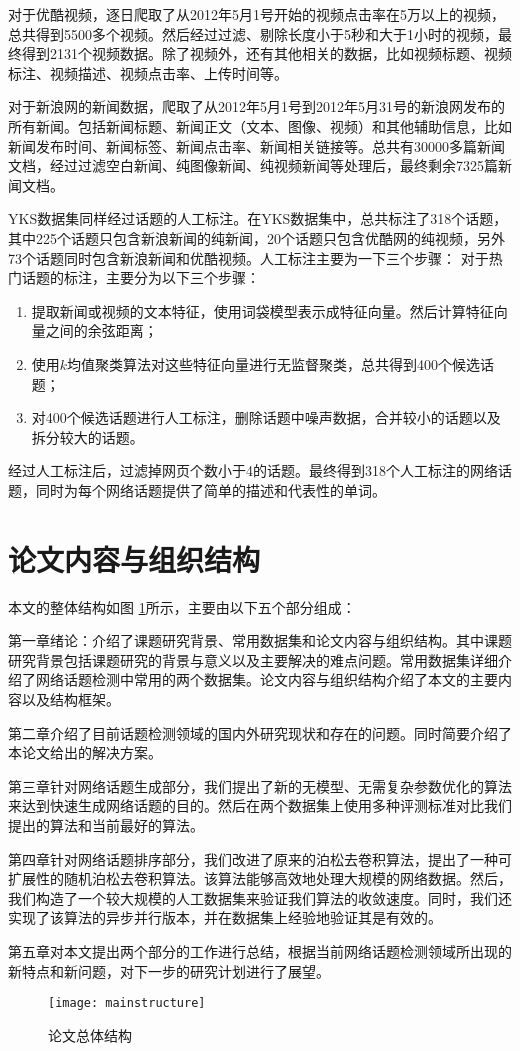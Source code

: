 对于优酷视频，逐日爬取了从2012年5月1号开始的视频点击率在5万以上的视频，总共得到5500多个视频。然后经过过滤、剔除长度小于5秒和大于1小时的视频，最终得到2131个视频数据。除了视频外，还有其他相关的数据，比如视频标题、视频标注、视频描述、视频点击率、上传时间等。

对于新浪网的新闻数据，爬取了从2012年5月1号到2012年5月31号的新浪网发布的所有新闻。包括新闻标题、新闻正文（文本、图像、视频）和其他辅助信息，比如新闻发布时间、新闻标签、新闻点击率、新闻相关链接等。总共有30000多篇新闻文档，经过过滤空白新闻、纯图像新闻、纯视频新闻等处理后，最终剩余7325篇新闻文档。

YKS数据集同样经过话题的人工标注。在YKS数据集中，总共标注了318个话题，其中225个话题只包含新浪新闻的纯新闻，20个话题只包含优酷网的纯视频，另外73个话题同时包含新浪新闻和优酷视频。人工标注主要为一下三个步骤：
对于热门话题的标注，主要分为以下三个步骤：
\begin{enumerate}
    \item[(1)] 提取新闻或视频的文本特征，使用词袋模型表示成特征向量。然后计算特征向量之间的余弦距离；
    \item[(2)] 使用$k$均值聚类算法对这些特征向量进行无监督聚类，总共得到400个候选话题；
    \item[(3)] 对400个候选话题进行人工标注，删除话题中噪声数据，合并较小的话题以及拆分较大的话题。
\end{enumerate}

经过人工标注后，过滤掉网页个数小于4的话题。最终得到318个人工标注的网络话题，同时为每个网络话题提供了简单的描述和代表性的单词。



\section{论文内容与组织结构}

本文的整体结构如图 \ref{fig:mainstructure}所示，主要由以下五个部分组成：

第一章绪论：介绍了课题研究背景、常用数据集和论文内容与组织结构。其中课题研究背景包括课题研究的背景与意义以及主要解决的难点问题。常用数据集详细介绍了网络话题检测中常用的两个数据集。论文内容与组织结构介绍了本文的主要内容以及结构框架。

第二章介绍了目前话题检测领域的国内外研究现状和存在的问题。同时简要介绍了本论文给出的解决方案。

第三章针对网络话题生成部分，我们提出了新的无模型、无需复杂参数优化的算法来达到快速生成网络话题的目的。然后在两个数据集上使用多种评测标准对比我们提出的算法和当前最好的算法。

第四章针对网络话题排序部分，我们改进了原来的泊松去卷积算法，提出了一种可扩展性的随机泊松去卷积算法。该算法能够高效地处理大规模的网络数据。然后，我们构造了一个较大规模的人工数据集来验证我们算法的收敛速度。同时，我们还实现了该算法的异步并行版本，并在数据集上经验地验证其是有效的。

第五章对本文提出两个部分的工作进行总结，根据当前网络话题检测领域所出现的新特点和新问题，对下一步的研究计划进行了展望。
\begin{figure}[!htbp]
    \centering
    \texttt{[image: mainstructure]}
    \caption{论文总体结构}
    \label{fig:mainstructure}
\end{figure} 
